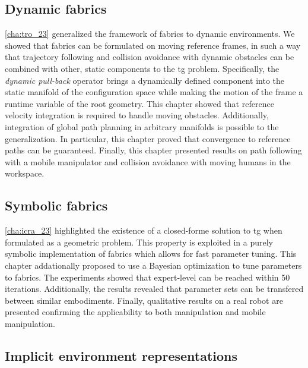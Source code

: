 \subsection{Dynamic fabrics}
\label{sec:conclusion_dynamic_fabrics}

\cref{cha:tro_23} generalized the framework of \ac{fabrics} to dynamic
environments. We showed that \ac{fabrics} can be formulated on moving reference
frames, in such a way that trajectory following and collision avoidance with
dynamic obstacles can be combined with other, static components to the \ac{tg}
problem. Specifically, the \textit{dynamic pull-back}
operator brings a dynamically defined component into the static manifold of the
configuration space while making the motion of the frame a runtime variable of
the root geometry. This chapter showed that reference velocity integration is
required to handle moving obstacles. Additionally, integration of global path
planning in arbitrary manifolds is possible to the generalization. In
particular, this chapter proved that convergence to reference paths can be 
guaranteed. Finally, this chapter presented results on path following with a
mobile manipulator and collision avoidance with moving humans in the workspace.


\subsection{Symbolic fabrics}
\label{sec:conclusion_symbolic_fabrics}

\cref{cha:icra_23} highlighted the existence of a
closed-forme solution to \ac{tg} when formulated as a geometric problem.
This property is exploited in a purely symbolic implementation of \ac{fabrics}
which allows for fast parameter tuning. This chapter addationally
proposed to use a Bayesian optimization to tune parameters to \ac{fabrics}.
The experiments showed that expert-level can be reached within 50 iterations.
Additionally, the results revealed that parameter sets can be transfered between
similar embodiments. Finally, qualitative results on a real robot are presented
confirming the applicability to both manipulation and mobile
manipulation.

\subsection{Implicit environment representations}
\label{sec:conclusion_implicit}


